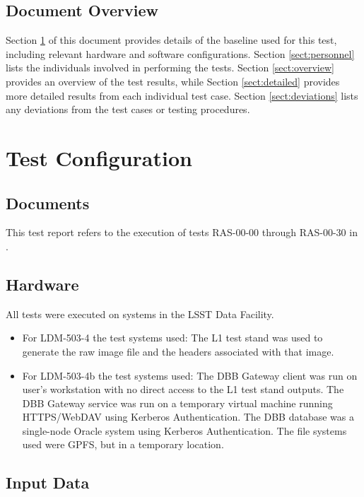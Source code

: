 \documentclass[DM,lsstdraft,STR,toc]{lsstdoc}
\begin{document}
\subsection{Document Overview}
\label{sect:docoverview}

Section \ref{sect:configuration} of this document provides details of the \product{} baseline used for this test, including relevant hardware and software configurations.
Section \ref{sect:personnel} lists the individuals involved in performing the tests.
Section \ref{sect:overview} provides an overview of the test results, while Section \ref{sect:detailed} provides more detailed results from each individual test case.
Section \ref{sect:deviations} lists any deviations from the test cases or testing procedures.

\section{Test Configuration}
\label{sect:configuration}

\subsection{Documents}

This test report refers to the execution of tests RAS-00-00 through RAS-00-30 in .

\subsection{Hardware}
\label{sect:hwconf}

All tests were executed on systems in the LSST Data Facility.

\begin{itemize}
\item{
For LDM-503-4 the test systems used:
The L1 test stand was used to generate the raw image file and the headers associated with that image.
}
\item {
For LDM-503-4b the test systems used:
The DBB Gateway client was run on user's workstation with no direct access to the L1 test stand outputs.
The DBB Gateway service was run on a temporary virtual machine running HTTPS/WebDAV using Kerberos Authentication.
The DBB database was a single-node Oracle system using Kerberos Authentication.
The file systems used were GPFS, but in a temporary location.
}
\end{itemize}

\subsection{Input Data}
\label{sect:inputdata}
\end{document}

